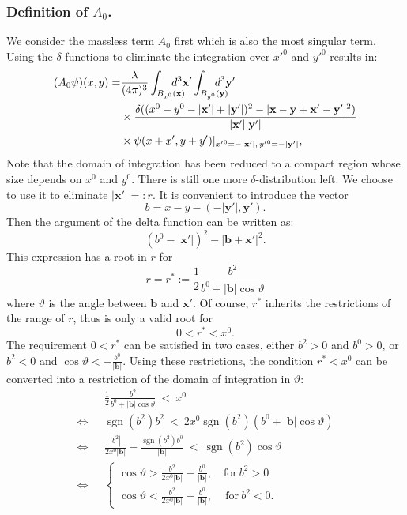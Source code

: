 \documentclass[b5paper,draft,openbib,12pt]{memoir}
\newcommand{\vx}{\mathbf{x}}
\newcommand{\vy}{\mathbf{y}}
\newcommand{\vb}{\mathbf{b}}
\DeclareMathOperator{\sgn}{sgn}
\begin{document}
\subsubsection{Definition of \(A_0\).}
We consider the massless term $A_0$ first which is also the most 
singular term. Using the $\delta$-functions to eliminate the 
integration over ${x'}^0$ and ${y'}^0$ results in:
\begin{align}
	(A_0 \psi)(x,y) =& \frac{\lambda}{(4\pi)^3} \int_{B_{x^0}(\vx)} \hspace{-0.5cm}d^3\vx' \int_{B_{y^0}(\vy)} \hspace{-0,5cm}d^3 \vy' \,   \nonumber \\
  &\times \frac{\delta((x^0-y^0-|\vx'|+|\vy'|)^2-|\vx-\vy +\vx'-\vy'|^2)}{|\vx'||\vy'|}\notag\\
  &\times \psi(x+x',y+y')|_{{x'}^0 = -|\vx'|, \, {y'}^0 = -|\vy'|},
	\label{eq:a0informal2}
\end{align}
Note that the domain of integration has been reduced to a compact 
region whose size depends on $x^0$ and $y^0$. There is still one 
more $\delta$-distribution left. We choose to use it to eliminate 
$|\vx'| =: r$. It is convenient to introduce the vector
\begin{equation}
	b = x-y-(-|\vy'|, \vy').
\label{eq:b}
\end{equation}
Then the argument of the delta function can be written as:
\begin{equation}
	(b^0-|\vx'|)^2 - |\vb + \vx'|^2.
\end{equation}
This expression has a root in $r$ for
\begin{equation}
	r =  r^* := \frac{1}{2} \frac{b^2}{b^0 + |\vb| \cos \vartheta}
\label{eq:r}
\end{equation}
where $\vartheta$ is the angle between $\vb$ and $\vx'$. Of course, 
$r^*$ inherits the restrictions of the range of $r$, thus is only a 
valid root for
\begin{equation}
	0 < r^* < x^0.
\end{equation}
The requirement $0 < r^*$ can be satisfied in two cases, either 
\(b^2>0\) and \(b^0>0\), or \(b^2<0\) and \(\cos\vartheta< - 
\frac{b^0}{|\vb|}\). Using these restrictions, the condition 
$r^*< x^0$ can be converted into a restriction of the domain of 
integration in \(\vartheta\):
\begin{align}
   & \frac{1}{2}\frac{b^2}{b^0+|\vb|\cos\vartheta}~ <~x^0\nonumber\\
   \iff~~~ &\sgn(b^2) b^2 ~< ~ 2x^0 \sgn(b^2) ( b^0+|\vb|\cos \vartheta)\nonumber\\
    \iff~~~ &\frac{|b^2|}{2x^0 |\vb|} -\frac{\sgn(b^2)b^0}{|\vb|} ~<~ \sgn(b^2) \cos \vartheta\nonumber\\
    \iff ~~~&\left\{\begin{matrix}\cos\vartheta > \frac{b^2}{2x^0|\vb|}- \frac{b^0}{|\vb|}, \quad \text{for} ~ b^2 >0 \\ \cos\vartheta < \frac{b^2}{2x^0|\vb|} - \frac{b^0}{|\vb|}, \quad \,  \text{for} ~ b^2<0. \end{matrix} \right.
\end{align}
\end{document}

